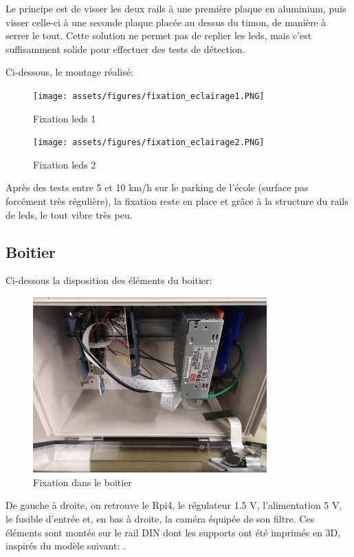 Le principe est de visser les deux rails à une première plaque en aluminium, puis visser celle-ci à une seconde plaque placée au dessus du timon,
de manière à serrer le tout. Cette solution ne permet pas de replier les leds, mais c'est suffisamment solide pour effectuer des tests de détection.

Ci-dessous, le montage réalisé:

\begin{figure}[H]
    \centering
    \texttt{[image: assets/figures/fixation\_eclairage1.PNG]}
    \caption{Fixation leds 1}
\end{figure}

\begin{figure}[H]
    \centering
    \texttt{[image: assets/figures/fixation\_eclairage2.PNG]}
    \caption{Fixation leds 2}
\end{figure}

Après des tests entre 5 et 10 km/h sur le parking de l'école (surface pas forcément très régulière), la fixation reste en place et grâce à la structure du rails de leds, le tout vibre très peu.
\subsection{Boitier}
Ci-dessous la disposition des éléments du boitier:

\begin{figure}[H]
    \centering
    \includegraphics[width=9cm]{assets/figures/boitier_montage.jpg}
    \caption{Fixation dans le boitier}
\end{figure}

De gauche à droite, on retrouve le Rpi4, le régulateur 1.5 V, l'alimentation 5 V, le fusible d'entrée et,
en bas à droite, la caméra équipée de son filtre. Ces éléments sont montés sur le rail DIN dont les supports ont été imprimés
en 3D, inspirés du modèle suivant: \cite{support_Rpi_3D}.

